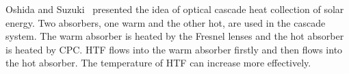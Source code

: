 


Oshida and Suzuki~\cite{Oshida1987} presented the idea of optical cascade heat collection of solar energy. Two absorbers, one warm and the other hot, are used in the cascade system. The warm absorber is heated by the Fresnel lenses and the hot absorber is heated by CPC. HTF flows into the warm absorber firstly and then flows into the hot absorber. The temperature of HTF can increase more effectively.

